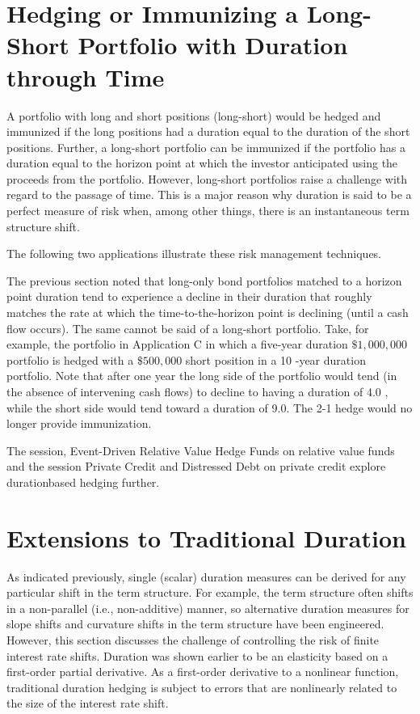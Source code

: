 \documentclass[11pt]{article}
\begin{document}
\section*{Hedging or Immunizing a Long-Short Portfolio with Duration through Time}
A portfolio with long and short positions (long-short) would be hedged and immunized if the long positions had a duration equal to the duration of the short positions. Further, a long-short portfolio can be immunized if the portfolio has a duration equal to the horizon point at which the investor anticipated using the proceeds from the portfolio. However, long-short portfolios raise a challenge with regard to the passage of time. This is a major reason why duration is said to be a perfect measure of risk when, among other things, there is an instantaneous term structure shift.

The following two applications illustrate these risk management techniques.

The previous section noted that long-only bond portfolios matched to a horizon point duration tend to experience a decline in their duration that roughly matches the rate at which the time-to-the-horizon point is declining (until a cash flow occurs). The same cannot be said of a long-short portfolio. Take, for example, the portfolio in Application C in which a five-year duration $\$ 1,000,000$ portfolio is hedged with a $\$ 500,000$ short position in a 10 -year duration portfolio. Note that after one year the long side of the portfolio would tend (in the absence of intervening cash flows) to decline to having a duration of 4.0 , while the short side would tend toward a duration of 9.0. The 2-1 hedge would no longer provide immunization.

The session, Event-Driven Relative Value Hedge Funds on relative value funds and the session Private Credit and Distressed Debt on private credit explore durationbased hedging further.

\section*{Extensions to Traditional Duration}
As indicated previously, single (scalar) duration measures can be derived for any particular shift in the term structure. For example, the term structure often shifts in a non-parallel (i.e., non-additive) manner, so alternative duration measures for slope shifts and curvature shifts in the term structure have been engineered. However, this section discusses the challenge of controlling the risk of finite interest rate shifts. Duration was shown earlier to be an elasticity based on a first-order partial derivative. As a first-order derivative to a nonlinear function, traditional duration hedging is subject to errors that are nonlinearly related to the size of the interest rate shift.
\end{document}
